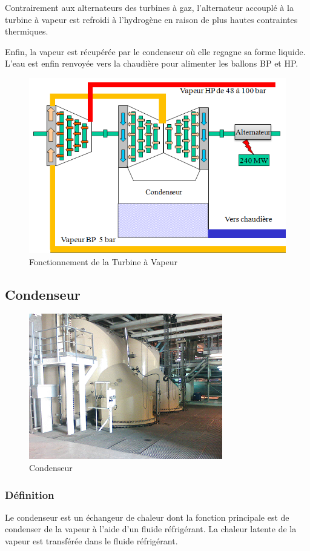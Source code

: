 Contrairement aux alternateurs des turbines à gaz, l'alternateur accouplé à la turbine à vapeur est refroidi à l'hydrogène en raison de plus hautes contraintes thermiques.

Enfin, la vapeur est récupérée par le condenseur où elle regagne sa forme liquide. L'eau est enfin renvoyée vers la chaudière pour alimenter les ballons BP et HP. 
\begin{figure}[hbtp]
\centering
\includegraphics[scale=0.8]{./Figures/echange_tv.png}
\caption{Fonctionnement de la Turbine à Vapeur}
\end{figure}
\subsection{Condenseur}
\begin{figure}[hbtp]
\centering
\includegraphics[scale=0.9]{./Figures/condenseur.png}
\caption{Condenseur}

\end{figure}
\subsubsection{Définition}
Le condenseur est un échangeur de chaleur dont la fonction principale est de condenser de la vapeur à l'aide d'un fluide réfrigérant. La chaleur latente de la vapeur est transférée dans le fluide réfrigérant.

